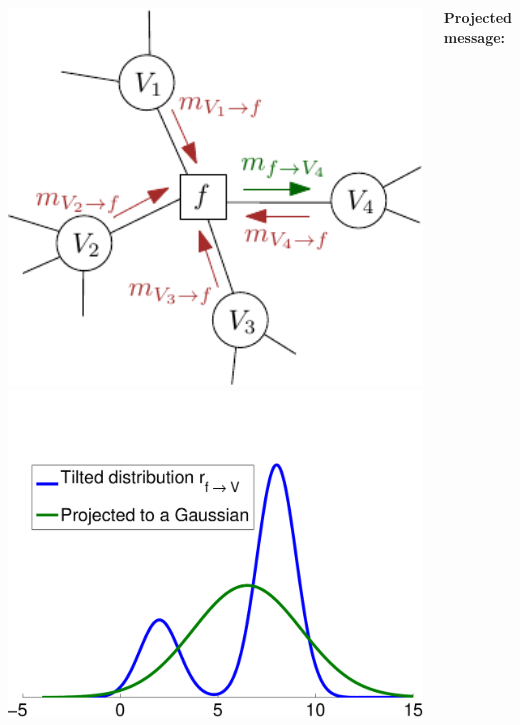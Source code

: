 \documentclass[25pt, a0paper, portrait, margin=0mm, innermargin=10mm,
     blockverticalspace=7mm, colspace=7mm, subcolspace=8mm]{tikzposter} %
\begin{document}
\begin{columns}
{\vspace{-5mm}

\begin{tikzfigure}[]
    \vspace{-10mm}
 \includegraphics[width=17cm]{img/factor_graph-crop.pdf}
 \hspace{1cm}
 \includegraphics[width=17cm]{img/proj_demo-crop.pdf}
\end{tikzfigure}
%
\textbf{Projected message:} 

}
\end{columns}
\end{document}
